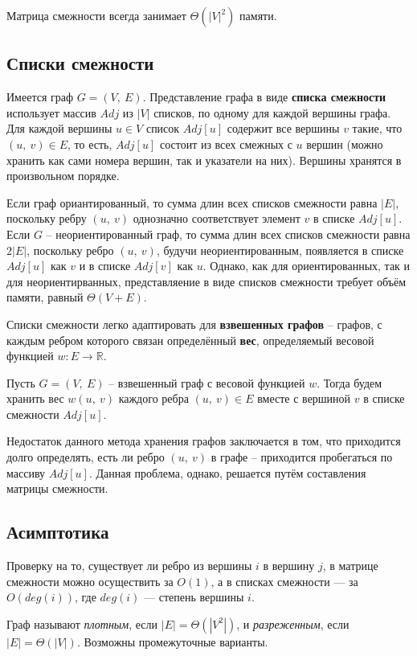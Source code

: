 \documentclass[a4paper,12pt]{article}
\newcommand{\R}{\mathbb{R}}
\begin{document}
Матрица смежности всегда занимает $\Theta(|V|^2)$ памяти.

\subsection{Списки смежности}

Имеется граф $G = (V,\ E)$. Представление графа в виде \textbf{списка смежности} использует массив $Adj$ из $|V|$ списков, по одному для каждой вершины графа. Для каждой вершины $u \in V$ список $Adj[u]$ содержит все вершины $v$ такие, что $(u,\ v) \in E$, то есть, $Adj[u]$ состоит из всех смежных с $u$ вершин (можно хранить как сами номера вершин, так и указатели на них). Вершины хранятся в произвольном порядке.

Если граф ориантированный, то сумма длин всех списков смежности равна $|E|$, поскольку ребру $(u,\ v)$ однозначно соответствует элемент $v$ в списке $Adj[u]$. Если $G$ -- неориентированный граф, то сумма длин всех списков смежности равна $2|E|$, поскольку ребро $(u,\ v)$, будучи неориентированным, появляется в списке $Adj[u]$ как $v$ и в списке $Adj[v]$ как $u$. Однако, как для ориентированных, так и для неориентирванных, представляение в виде списков смежности требует объём памяти, равный $\Theta(V + E)$.

Списки смежности легко адаптировать для \textbf{взвешенных графов} -- графов, с каждым ребром которого связан определённый \textbf{вес}, определяемый весовой функцией $w : E \to \R$.

Пусть $G = (V,\ E)$ -- взвешенный граф с весовой функцией $w$. Тогда будем хранить вес $w(u,\ v)$ каждого ребра $(u,\ v)\in E$ вместе с вершиной $v$ в списке смежности $Adj[u]$.

Недостаток данного метода хранения графов заключается в том, что приходится долго определять, есть ли ребро $(u,\ v)$ в графе -- приходится пробегаться по массиву $Adj[u]$. Данная проблема, однако, решается путём составления матрицы смежности.

\subsection{Асимптотика}

Проверку на то, существует ли ребро из вершины $i$ в вершину $j$, в матрице смежности можно осуществить за $O(1)$, а в списках смежности --- за $O(deg(i))$, где $deg(i)$ --- степень вершины $i$.

Граф называют \emph{плотным}, если $|E| = \Theta(|V^2|)$, и \emph{разреженным}, если $|E| = \Theta(|V|)$. Возможны промежуточные варианты.
\end{document}
